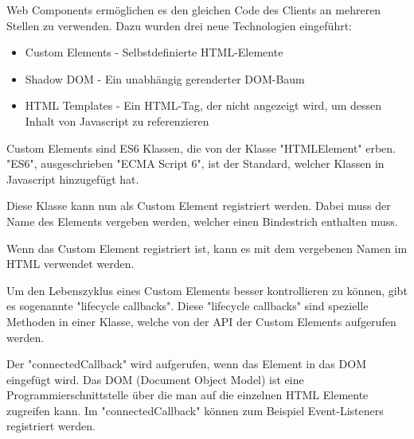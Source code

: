 
Web Components ermöglichen es den gleichen Code des Clients an mehreren Stellen zu verwenden. Dazu wurden drei neue Technologien \cite{MDNWebComponents} eingeführt:

\begin{itemize}
    \item Custom Elements - Selbstdefinierte HTML-Elemente
    \item Shadow DOM - Ein unabhängig gerenderter DOM-Baum
    \item HTML Templates - Ein HTML-Tag, der nicht angezeigt wird, um dessen Inhalt von Javascript zu referenzieren
\end{itemize}




Custom Elements sind ES6 Klassen, die von der Klasse "HTMLElement" erben. "ES6", ausgeschrieben "ECMA Script 6", ist der Standard, welcher Klassen in Javascript hinzugefügt hat.\cite{MDNes6Classes}


Diese Klasse kann nun als Custom Element registriert werden. Dabei muss der Name des Elements vergeben werden, welcher einen Bindestrich enthalten muss.


Wenn das Custom Element registriert ist, kann es mit dem vergebenen Namen im HTML verwendet werden.



Um den Lebenszyklus eines Custom Elements besser kontrollieren zu können, gibt es sogenannte "lifecycle callbacks". Diese "lifecycle callbacks" sind spezielle Methoden in einer Klasse, welche von der API der Custom Elements aufgerufen werden.

Der "{\ttfamily connectedCallback}" wird aufgerufen, wenn das Element in das DOM eingefügt wird. Das DOM (Document Object Model) ist eine Programmierschnittstelle über die man auf die einzelnen HTML Elemente zugreifen kann. \cite{MDNDOM} Im "{\ttfamily connectedCallback}" können zum Beispiel Event-Listeners registriert werden.

